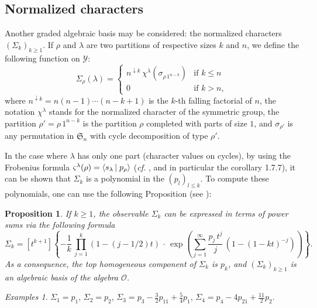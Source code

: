 \documentclass[10pt]{amsart}
\newtheorem{proposition}[theorem]{Proposition}
\theoremstyle{remark}
\newtheorem{examples}[example]{Examples}
\newcommand{\sym}{\mathfrak{S}}
\newcommand{\young}{\mathscr{Y}}
\newcommand{\obs}{\mathscr{O}}
\newcommand{\scal}[2]{\left\langle #1\vphantom{#2}\,\right |\left.#2 \vphantom{#1}\right\rangle}
\begin{document}
\subsection{Normalized characters}
Another graded algebraic basis may be considered: the normalized cha\-racters $(\varSigma_k)_{k \geq 1}$. If $\rho$ and $\lambda$ are two partitions of respective sizes $k$ and $n$, we define the following function on $\young$:
$$\varSigma_\rho(\lambda)=\begin{cases}
	                  n^{\downarrow k}\,\chi^\lambda(\sigma_{\rho\,1^{n-k}})&\text{if }k\leq n\\
                          0 & \text{if } k>n,
                          \end{cases}
$$
where $n^{\downarrow k}=n(n-1)\cdots(n-k+1)$ is the $k$-th falling factorial of $n$, the notation $\chi^\lambda$ stands for the normalized character of the symmetric group, the partition $\rho'=\rho\,1^{n-k}$ is the partition $\rho$ completed with parts of size $1$, and $\sigma_{\rho'}$ is any permutation in $\sym_n$ with cycle decomposition of type $\rho'$.\bigskip

In the case where $\lambda$ has only one part (character values on cycles), by using the Frobenius formula $\varsigma^\lambda(\rho)=\scal{s_\lambda}{p_\rho}$ (\emph{cf.} \cite[\S1.7]{Mac95}, and in particular the corollary 1.7.7), it can be shown that  $\varSigma_k$ is a polynomial in the $(p_l)_{l \leq k}$. To compute these polynomials, one can use the following Proposition (see \cite[Propositions 3.3 and 3.4, 4.4 and 4.5]{IO02}):
\begin{proposition}\label{prop:sigma_pk} If $k\geq 1$, the observable $\varSigma_k$ can be expressed in terms of power sums {\it via} the following formula
\begin{equation} \label{eq:p_fct_sigma}
\varSigma_k=[t^{k+1}] \left\{-\frac{1}{k}\,\prod_{j=1}^k (1-(j-1/2)t)\,\cdot\,\exp\left(\sum_{j=1}^\infty \frac{p_j\,t^j}{j}\,(1-(1-kt)^{-j}) \right)\right\}.
\end{equation}
\noindent As a consequence, the top homogeneous component of $\varSigma_k$ is $p_k$, and $(\varSigma_k)_{k \geq 1}$ is an algebraic basis of the algebra $\obs$.
\end{proposition}
\begin{examples}
$\varSigma_{1}=p_{1}$, $\varSigma_{2}=p_{2}$,
$\varSigma_{3}=p_{3}-\frac{3}{2} p_{11}+\frac{5}{4}p_{1}$,
$\varSigma_{4}=p_{4}-4p_{21}+\frac{11}{2}p_{2}$.
\end{examples}\bigskip
\end{document}
